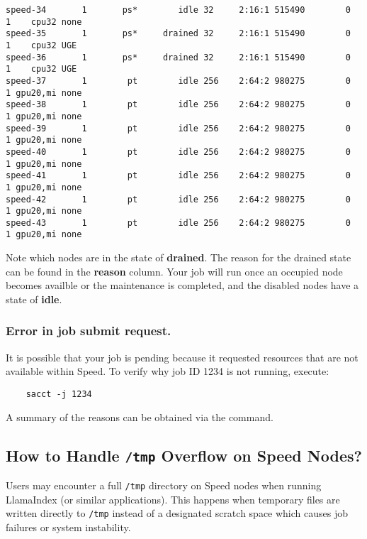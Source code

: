 \begin{verbatim}
speed-34       1       ps*        idle 32     2:16:1 515490        0      1    cpu32 none
speed-35       1       ps*     drained 32     2:16:1 515490        0      1    cpu32 UGE
speed-36       1       ps*     drained 32     2:16:1 515490        0      1    cpu32 UGE
speed-37       1        pt        idle 256    2:64:2 980275        0      1 gpu20,mi none
speed-38       1        pt        idle 256    2:64:2 980275        0      1 gpu20,mi none
speed-39       1        pt        idle 256    2:64:2 980275        0      1 gpu20,mi none
speed-40       1        pt        idle 256    2:64:2 980275        0      1 gpu20,mi none
speed-41       1        pt        idle 256    2:64:2 980275        0      1 gpu20,mi none
speed-42       1        pt        idle 256    2:64:2 980275        0      1 gpu20,mi none
speed-43       1        pt        idle 256    2:64:2 980275        0      1 gpu20,mi none
\end{verbatim}
\normalsize

\noindent Note which nodes are in the state of \textbf{drained}.
The reason for the drained state can be found in the \textbf{reason} column.
Your job will run once an occupied node becomes availble or the maintenance is completed,
and the disabled nodes have a state of \textbf{idle}.

\subsubsection{Error in job submit request.}
It is possible that your job is pending because it requested resources that are not available within Speed. 
To verify why job ID 1234 is not running, execute:
\begin{verbatim}
	sacct -j 1234
\end{verbatim}

\noindent A summary of the reasons can be obtained via the  command.

\subsection{How to Handle \texttt{/tmp} Overflow on Speed Nodes?}
\label{sect:faq-tmp-on-speed}

Users may encounter a full \texttt{/tmp} directory on Speed nodes when running LlamaIndex (or similar applications).
This happens when temporary files are written directly to \texttt{/tmp} instead of a designated scratch space which causes job failures or system instability.

